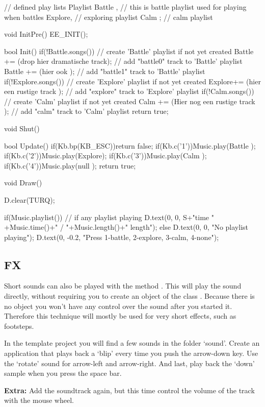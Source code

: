 \begin{code}
// defined play lists
Playlist Battle , // this is battle playlist used for playing when battles
         Explore, // exploring playlist
         Calm   ; // calm playlist

void InitPre()
{
   EE_INIT();
}

bool Init()
{
   if(!Battle.songs())                         // create 'Battle' playlist if not yet created
   {
      Battle += (drop hier dramatische track); // add "battle0" track to 'Battle' playlist
      Battle += (hier ook                   ); // add "battle1" track to 'Battle' playlist
   }
   if(!Explore.songs())                        // create 'Explore' playlist if not yet created
   {
      Explore+= (hier een rustige track     ); // add "explore" track to 'Explore' playlist
   }
   if(!Calm.songs())                           // create 'Calm' playlist if not yet created
   {
      Calm   += (Hier nog een rustige track ); // add "calm" track to 'Calm' playlist
   }
   return true;
}

void Shut()
{
}

bool Update()
{
   if(Kb.bp(KB_ESC))return false;
   if(Kb.c('1'))Music.play(Battle );
   if(Kb.c('2'))Music.play(Explore);
   if(Kb.c('3'))Music.play(Calm   );
   if(Kb.c('4'))Music.play(null   );
   return true;
}

void Draw()
{
   D.clear(TURQ);

   if(Music.playlist()) // if any playlist playing
   {
      D.text(0, 0, S+"time " +Music.time()+" / "+Music.length()+" length");
   }else
   {
      D.text(0, 0, "No playlist playing");
   }
   D.text(0, -0.2, "Press 1-battle, 2-explore, 3-calm, 4-none");
}
\end{code}

\subsection{FX}
Short sounds can also be played with the method . This will play the sound directly, without requiring you to create an object of the class . Because there is no object you won't have any control over the sound after you started it. Therefore this technique will mostly be used for very short effects, such as footsteps. 

\begin{exercise}
In the template project you will find a few sounds in the folder `sound'. Create an application that plays back a `blip' every time you push the arrow-down key. Use the `rotate' sound for arrow-left and arrow-right. And last, play back the `down' sample when you press the space bar.

\textbf{Extra:} Add the soundtrack again, but this time control the volume of the track with the mouse wheel.
\end{exercise}
 